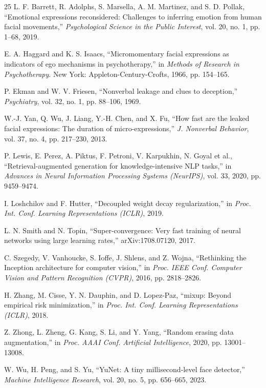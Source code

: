 \documentclass[conference]{IEEEtran}
\begin{document}
\begin{thebibliography}{25}
L. F. Barrett, R. Adolphs, S. Marsella, A. M. Martinez, and S. D. Pollak, ``Emotional expressions reconsidered: Challenges to inferring emotion from human facial movements,'' \emph{Psychological Science in the Public Interest}, vol. 20, no. 1, pp. 1--68, 2019.

E. A. Haggard and K. S. Isaacs, ``Micromomentary facial expressions as indicators of ego mechanisms in psychotherapy,'' in \emph{Methods of Research in Psychotherapy}. New York: Appleton-Century-Crofts, 1966, pp. 154--165.

P. Ekman and W. V. Friesen, ``Nonverbal leakage and clues to deception,'' \emph{Psychiatry}, vol. 32, no. 1, pp. 88--106, 1969.

W.-J. Yan, Q. Wu, J. Liang, Y.-H. Chen, and X. Fu, ``How fast are the leaked facial expressions: The duration of micro-expressions,'' \emph{J. Nonverbal Behavior}, vol. 37, no. 4, pp. 217--230, 2013.

P. Lewis, E. Perez, A. Piktus, F. Petroni, V. Karpukhin, N. Goyal et al., ``Retrieval-augmented generation for knowledge-intensive NLP tasks,'' in \emph{Advances in Neural Information Processing Systems (NeurIPS)}, vol. 33, 2020, pp. 9459--9474.

I. Loshchilov and F. Hutter, ``Decoupled weight decay regularization,'' in \emph{Proc. Int. Conf. Learning Representations (ICLR)}, 2019.

L. N. Smith and N. Topin, ``Super-convergence: Very fast training of neural networks using large learning rates,'' arXiv:1708.07120, 2017.

C. Szegedy, V. Vanhoucke, S. Ioffe, J. Shlens, and Z. Wojna, ``Rethinking the Inception architecture for computer vision,'' in \emph{Proc. IEEE Conf. Computer Vision and Pattern Recognition (CVPR)}, 2016, pp. 2818--2826.

H. Zhang, M. Cisse, Y. N. Dauphin, and D. Lopez-Paz, ``mixup: Beyond empirical risk minimization,'' in \emph{Proc. Int. Conf. Learning Representations (ICLR)}, 2018.

Z. Zhong, L. Zheng, G. Kang, S. Li, and Y. Yang, ``Random erasing data augmentation,'' in \emph{Proc. AAAI Conf. Artificial Intelligence}, 2020, pp. 13001--13008.

W. Wu, H. Peng, and S. Yu, ``YuNet: A tiny millisecond-level face detector,'' \emph{Machine Intelligence Research}, vol. 20, no. 5, pp. 656--665, 2023.


\end{thebibliography}
\end{document}
